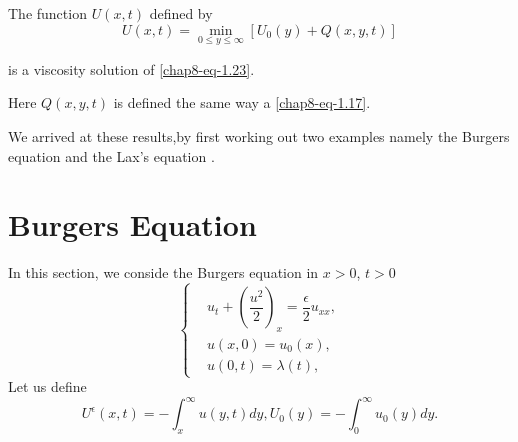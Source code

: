 \begin{thm}\label{chap8-thm-3}
The function $U(x, t)$ defined by
\begin{equation}\label{chap8-eq-1.24}
U(x,t)= \min\limits_{0 \leq y \leq \infty}[U_{0}(y) + Q(x, y,t)]
\end{equation}
\end{thm}
is a viscosity solution of \eqref{chap8-eq-1.23}.

Here $Q(x,y,t)$ is defined the same way a \eqref{chap8-eq-1.17}.

We arrived at these results,by first working out two examples namely the Burgers equation \cite{chap8-key3} and the Lax's equation \cite{chap8-key4}.

\section{Burgers Equation}\label{chap8-sec-2}
In this section, we conside the Burgers equation in $x > 0$, $t>0$
\setcounter{equation}{0}
\begin{equation}\label{chap8-eq-2.1}
\left\{
\begin{aligned}
&u_{t} + \left(\dfrac{u^{2}}{2}\right)_{x} = \dfrac{\epsilon}{2}u_{xx},\\
&u(x,0)=u_{0}(x),\\
&u(0,t) = \lambda(t),
\end{aligned}
\right.
\end{equation}
Let us define
\begin{equation}\label{chap8-eq-2.2}
U^{\epsilon}(x,t) = -\int_{x}^{\infty} u(y,t)dy, U_{0}(y) = -\int_{0}^{\infty} u_{0}(y)dy.
\end{equation}


